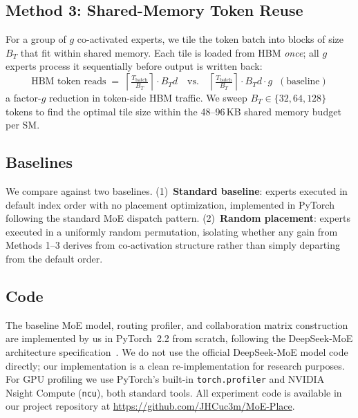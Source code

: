 \documentclass{article}
\begin{document}
\subsection{Method 3: Shared-Memory Token Reuse}
 
For a group of $g$ co-activated experts, we tile the token batch into blocks of
size $B_T$ that fit within shared memory.
Each tile is loaded from HBM \emph{once}; all $g$ experts process it sequentially
before output is written back:
\begin{equation}
    \text{HBM token reads} \;=\;
    \left\lceil \tfrac{T_{\mathrm{batch}}}{B_T} \right\rceil \cdot B_T d
    \quad\text{vs.}\quad
    \left\lceil \tfrac{T_{\mathrm{batch}}}{B_T} \right\rceil \cdot B_T d \cdot g
    \;\;(\text{baseline})
\end{equation}
a factor-$g$ reduction in token-side HBM traffic.
We sweep $B_T \in \{32, 64, 128\}$ tokens to find the optimal tile size within the
48–96\,KB shared memory budget per SM.
 
\subsection{Baselines}
 
We compare against two baselines.
(1)~\textbf{Standard baseline}: experts executed in default index order with no
placement optimization, implemented in PyTorch following the standard MoE dispatch
pattern.
(2)~\textbf{Random placement}: experts executed in a uniformly random permutation,
isolating whether any gain from Methods 1--3 derives from co-activation structure
rather than simply departing from the default order.
 
\subsection{Code}
 
The baseline MoE model, routing profiler, and collaboration matrix construction are
implemented by us in PyTorch~2.2 from scratch, following the DeepSeek-MoE
architecture specification~\citep{deepseek2024}.
We do not use the official DeepSeek-MoE model code directly; our implementation
is a clean re-implementation for research purposes.
For GPU profiling we use PyTorch's built-in \texttt{torch.profiler} and NVIDIA Nsight
Compute (\texttt{ncu}), both standard tools.
All experiment code is available in our project repository at
\url{https://github.com/JHCuc3m/MoE-Place}.
 
\end{document}
